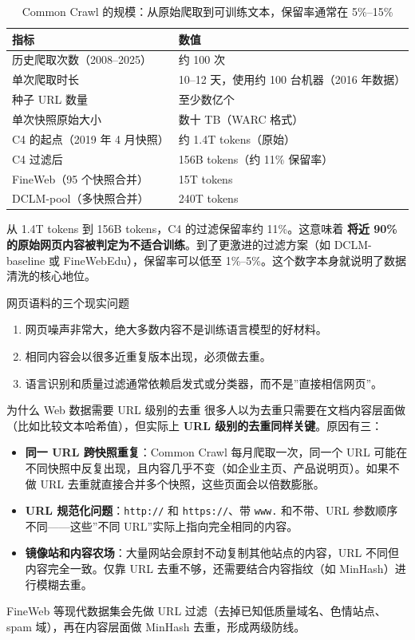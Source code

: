 \documentclass[a4paper]{article}
\begin{document}
\begin{table}[H]
\centering
\begin{tabular}{p{}p{}}
\toprule
\textbf{指标} & \textbf{数值} \\
\midrule
历史爬取次数（2008--2025） & 约 100 次 \\
单次爬取时长 & 10--12 天，使用约 100 台机器（2016 年数据） \\
种子 URL 数量 & 至少数亿个 \\
单次快照原始大小 & 数十 TB（WARC 格式） \\
C4 的起点（2019 年 4 月快照） & 约 1.4T tokens（原始） \\
C4 过滤后 & 156B tokens（约 11\% 保留率） \\
FineWeb（95 个快照合并） & 15T tokens \\
DCLM-pool（多快照合并） & 240T tokens \\
\bottomrule
\end{tabular}
\caption{Common Crawl 的规模：从原始爬取到可训练文本，保留率通常在 5\%--15\%}
\end{table}

从 1.4T tokens 到 156B tokens，C4 的过滤保留率约 11\%。这意味着 \textbf{将近 90\% 的原始网页内容被判定为不适合训练}。到了更激进的过滤方案（如 DCLM-baseline 或 FineWebEdu），保留率可以低至 1\%--5\%。这个数字本身就说明了数据清洗的核心地位。

\begin{knowledgebox}{网页语料的三个现实问题}
\begin{enumerate}
    \item 网页噪声非常大，绝大多数内容不是训练语言模型的好材料。
    \item 相同内容会以很多近重复版本出现，必须做去重。
    \item 语言识别和质量过滤通常依赖启发式或分类器，而不是”直接相信网页”。
\end{enumerate}
\end{knowledgebox}

\begin{knowledgebox}{为什么 Web 数据需要 URL 级别的去重}
很多人以为去重只需要在文档内容层面做（比如比较文本哈希值），但实际上 \textbf{URL 级别的去重同样关键}。原因有三：
\begin{itemize}
    \item \textbf{同一 URL 跨快照重复}：Common Crawl 每月爬取一次，同一个 URL 可能在不同快照中反复出现，且内容几乎不变（如企业主页、产品说明页）。如果不做 URL 去重就直接合并多个快照，这些页面会以倍数膨胀。
    \item \textbf{URL 规范化问题}：\texttt{http://} 和 \texttt{https://}、带 \texttt{www.} 和不带、URL 参数顺序不同——这些”不同 URL”实际上指向完全相同的内容。
    \item \textbf{镜像站和内容农场}：大量网站会原封不动复制其他站点的内容，URL 不同但内容完全一致。仅靠 URL 去重不够，还需要结合内容指纹（如 MinHash）进行模糊去重。
\end{itemize}
FineWeb 等现代数据集会先做 URL 过滤（去掉已知低质量域名、色情站点、spam 域），再在内容层面做 MinHash 去重，形成两级防线。
\end{knowledgebox}
\end{document}
